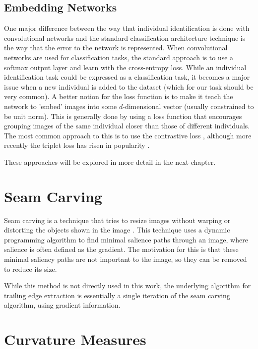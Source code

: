 \subsection{Embedding Networks}

One major difference between the way that individual identification is done with convolutional networks and the standard classification architecture technique is the way that the error to the network is represented.
When convolutional networks are used for classification tasks, the standard approach is to use a softmax output layer and learn with the cross-entropy loss.
While an individual identification task could be expressed as a classification task, it becomes a major issue when a new individual is added to the dataset (which for our task should be very common).
A better notion for the loss function is to make it teach the network to 'embed' images into some $d$-dimensional vector (usually constrained to be unit norm).
This is generally done by using a loss function that encourages grouping images of the same individual closer than those of different individuals.
The most common approach to this is to use the contrastive loss \cite{fan2014learning} \cite{chopra2005learning}, although more recently the triplet loss has risen in popularity \cite{schroff2015facenet} \cite{parkhi2015deep}.

These approaches will be explored in more detail in the next chapter.

\section{Seam Carving}

Seam carving is a technique that tries to resize images without warping or distorting the objects shown in the image \cite{Avidan:2007:SCC:1276377.1276390}.
This technique uses a dynamic programming algorithm to find minimal salience paths through an image, where salience is often defined as the gradient.
The motivation for this is that these minimal saliency paths are not important to the image, so they can be removed to reduce its size.

While this method is not directly used in this work, the underlying algorithm for trailing edge extraction is essentially a single iteration of the seam carving algorithm, using gradient information.

\section{Curvature Measures}

